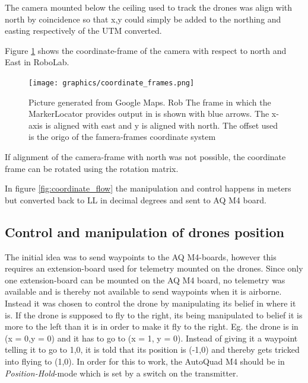 The camera mounted below the ceiling used to track the drones was align with north by coincidence so that x,y could simply be added to the northing and easting respectively of the \ac{UTM} converted.

Figure \ref{fig:coordinate_frames} shows the coordinate-frame of the camera with respect to north and East in RoboLab.

\begin{figure}[H]
    \center
    \texttt{[image: graphics/coordinate\_frames.png]}
  	\caption{Picture generated from Google Maps. Rob The frame in which the MarkerLocator provides output in is shown with blue arrows. The x-axis is aligned with east and y is aligned with north. The offset used is the origo of the famera-frames coordinate system}
    \label{fig:coordinate_frames}
\end{figure}

If alignment of the camera-frame with north was not possible, the coordinate frame can be rotated using the rotation matrix\cite{Choset_2005_5167}.

In figure \ref{fig:coordinate_flow} the manipulation and control happens in meters but converted back to \ac{LL} in decimal degrees and sent to AQ M4 board.

\subsection{Control and manipulation of drones position}
The initial idea was to send waypoints to the AQ M4-boards, however this requires an extension-board used for telemetry mounted on the drones. Since only one extension-board can be mounted on the AQ M4 board, no telemetry was available and is thereby not available to send waypoints when it is airborne. \\
Instead it was chosen to control the drone by manipulating its belief in where it is.
If the drone is supposed to fly to the right, its being manipulated to belief it is more to the left than it is in order to make it fly to the right. Eg. the drone is in (x = 0,y = 0) and it has to go to (x = 1, y = 0).
Instead of giving it a waypoint telling it to go to 1,0, it is told that its position is (-1,0) and thereby gets tricked into flying to (1,0). In order for this to work, the AutoQuad M4 should be in \textit{Position-Hold}-mode which is set by a switch on the transmitter.


